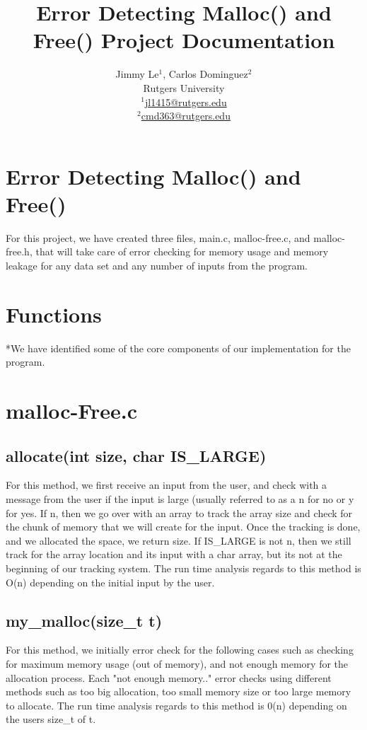 \documentclass{article}
\title{ Error Detecting Malloc() and Free() Project Documentation\\}
\date{}
\author{Jimmy Le$^{1}$, Carlos Dominguez$^{2}$\\
	Rutgers University\\
	\underline{$^{1}$jl1415@rutgers.edu}\\
	\underline{$^{2}$cmd363@rutgers.edu}}
\makeatletter
\renewcommand{\maketitle}{\bgroup\setlength{\parindent}{0pt}
\begin{flushleft}
  \textbf{\@title}
  \@author
\end{flushleft}\egroup
}
\makeatother
\begin{document}
\maketitle

\section{Error Detecting Malloc() and Free()}
For this project, we have created three files, main.c, malloc-free.c, and malloc-free.h, that will take care of error checking for memory usage and memory leakage for any data set
and any number of inputs from the program.

\section{Functions}
*We have identified some of the core components of our implementation for the program.

\section {malloc-Free.c}

\subsection*{allocate(int size, char IS\_LARGE)}
For this method, we first receive an input from the user, and check with a message from the user if the input is large (usually referred to as a n for no or y for yes.  If n, then we go over with an array to track the array size and check for the chunk of memory that we will create for the input. Once the tracking is done, and we allocated the space, we return size.  If IS\_LARGE is not n, then we still track for the array location and its input with a char array, but its not at the beginning of our tracking system.
The run time analysis regards to this method is O(n) depending on the initial input by the user. 

\subsection*{my\_malloc(size\_t t)}
For this method, we initially error check for the following cases such as checking for maximum memory usage (out of memory), and not enough memory for the allocation process.  Each "not enough memory.." error checks using different methods such as too big allocation, too small memory size or too large memory to allocate.
The run time analysis regards to this method is 0(n) depending on the users size_t of t.
\end{document}
